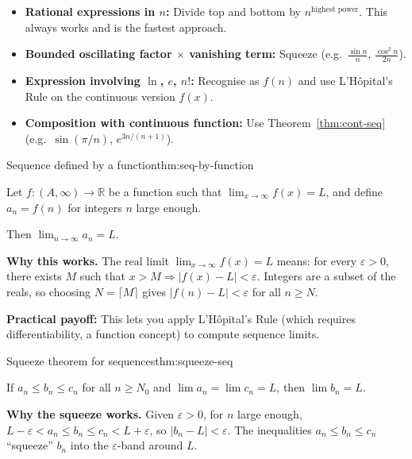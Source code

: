 \begin{examtip}[title={Exam Focus: When to use which method}]

\begin{itemize}[leftmargin=*]
\item \textbf{Rational expressions in $n$:} Divide top and bottom by $n^{\text{highest power}}$. This always works and is the fastest approach.
\item \textbf{Bounded oscillating factor $\times$ vanishing term:} Squeeze (e.g.\ $\frac{\sin n}{n}$, $\frac{\cos^2 n}{2n}$).
\item \textbf{Expression involving $\ln$, $e$, $n!$:} Recognise as $f(n)$ and use L'H\^opital's Rule on the continuous version $f(x)$.
\item \textbf{Composition with continuous function:} Use Theorem~\ref{thm:cont-seq} (e.g.\ $\sin(\pi/n)$, $e^{3n/(n+1)}$).
\end{itemize}
\end{examtip}

\begin{theorem}{Sequence defined by a function}{thm:seq-by-function}

Let $f:(A,\infty)\to\mathbb{R}$ be a function such that $\lim_{x\to\infty} f(x)=L$, and define $a_n=f(n)$ for integers $n$ large enough.

Then $\lim_{n\to\infty} a_n = L$.

\end{theorem}

\noindent
\textbf{Why this works.}
The real limit $\lim_{x\to\infty} f(x)=L$ means: for every $\varepsilon>0$, there exists $M$ such that $x>M\Rightarrow |f(x)-L|<\varepsilon$.
Integers are a subset of the reals, so choosing $N=\lceil M\rceil$ gives $|f(n)-L|<\varepsilon$ for all $n\ge N$.

\textbf{Practical payoff:} This lets you apply L'H\^opital's Rule (which requires differentiability, a function concept) to compute sequence limits.

\begin{theorem}{Squeeze theorem for sequences}{thm:squeeze-seq}

If $a_n\le b_n\le c_n$ for all $n\ge N_0$ and $\lim a_n=\lim c_n=L$, then $\lim b_n=L$.

\end{theorem}

\noindent
\textbf{Why the squeeze works.}
Given $\varepsilon>0$, for $n$ large enough, $L-\varepsilon<a_n\le b_n\le c_n<L+\varepsilon$, so $|b_n-L|<\varepsilon$.
The inequalities $a_n\le b_n\le c_n$ ``squeeze'' $b_n$ into the $\varepsilon$-band around $L$.

